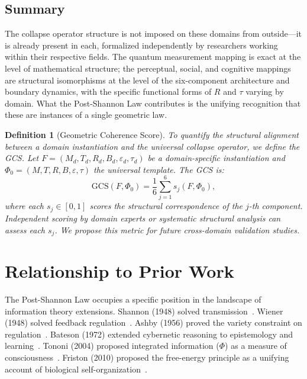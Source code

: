 \documentclass[11pt]{article}
\theoremstyle{plain}
\newtheorem{definition}{Definition}[section]
\begin{document}
\subsection{Summary}

The collapse operator structure is not imposed on these domains from outside---it is already
present in each, formalized independently by researchers working within their respective fields.
The quantum measurement mapping is exact at the level of mathematical structure; the perceptual,
social, and cognitive mappings are structural isomorphisms at the level of the six-component
architecture and boundary dynamics, with the specific functional forms of $R$ and $\tau$ varying by
domain. What the Post-Shannon Law contributes is the unifying recognition that these are instances
of a single geometric law.

\begin{definition}[Geometric Coherence Score]
To quantify the structural alignment between a domain instantiation and the universal collapse
operator, we define the GCS. Let $F = (M_d, T_d, R_d, B_d, \varepsilon_d, \tau_d)$ be a
domain-specific instantiation and $\Phi_0 = (M, T, R, B, \varepsilon, \tau)$ the universal
template. The GCS is:
\begin{equation}\label{eq:gcs}
  \mathrm{GCS}(F, \Phi_0) = \frac{1}{6} \sum_{j=1}^{6} s_j(F, \Phi_0),
\end{equation}
where each $s_j \in [0, 1]$ scores the structural correspondence of the $j$-th component.
Independent scoring by domain experts or systematic structural analysis can assess each $s_j$. We
propose this metric for future cross-domain validation studies.
\end{definition}

\section{Relationship to Prior Work}

The Post-Shannon Law occupies a specific position in the landscape of information theory
extensions. Shannon (1948) solved transmission~\cite{shannon1948}. Wiener (1948) solved feedback
regulation~\cite{wiener1948}. Ashby (1956) proved the variety constraint on
regulation~\cite{ashby1956}. Bateson (1972) extended cybernetic reasoning to epistemology and
learning~\cite{bateson1972}. Tononi (2004) proposed integrated information ($\Phi$) as a measure of
consciousness~\cite{tononi2004}. Friston (2010) proposed the free-energy principle as a unifying
account of biological self-organization~\cite{friston2010}.
\end{document}
